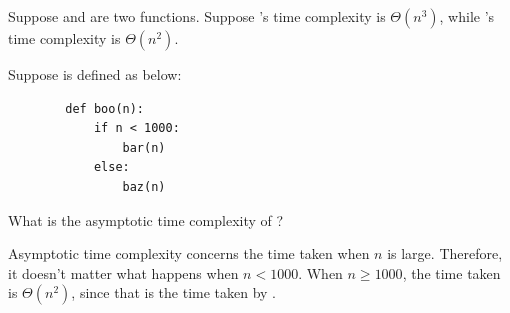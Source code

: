 \begin{prob}
    Suppose  and  are two functions.
    Suppose 's time complexity is $\Theta(n^3)$, while 's
    time complexity is $\Theta(n^2)$.

    Suppose  is defined as below:

    \begin{verbatim}
        def boo(n):
            if n < 1000:
                bar(n)
            else:
                baz(n)
    \end{verbatim}

    What is the asymptotic time complexity of ?


    \begin{soln}
        Asymptotic time complexity concerns the time taken when $n$ is large.
        Therefore, it doesn't matter what happens when $n < 1000$.
        When $n \geq 1000$, the time taken is $\Theta(n^2)$, since that is the
        time taken by .
    \end{soln}
\end{prob}
